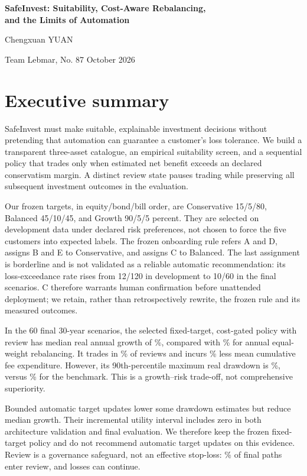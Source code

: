 \documentclass[11pt,a4paper]{article}
\begin{document}
\begin{center}
{\Large\bfseries SafeInvest: Suitability, Cost-Aware Rebalancing,\\[3pt]
and the Limits of Automation}\par
\vspace{7pt}
{\large Chengxuan YUAN}\par
Team Lebmar, No. 87  October 2026
\end{center}

\section*{Executive summary}
SafeInvest must make suitable, explainable investment decisions without
pretending that automation can guarantee a customer's loss tolerance. We build
a transparent three-asset catalogue, an empirical suitability screen, and a
sequential policy that trades only when estimated net benefit exceeds an
declared conservatism margin. A distinct review state pauses trading while preserving
all subsequent investment outcomes in the evaluation.

Our frozen targets, in equity/bond/bill order, are Conservative
15/5/80, Balanced 45/10/45, and Growth 90/5/5 percent. They are selected on
development data under declared risk preferences, not chosen to force the five
customers into expected labels. The frozen onboarding rule refers A and D,
assigns B and E to Conservative, and assigns C to Balanced.
The last assignment is borderline and is not validated as a reliable automatic
recommendation: its loss-exceedance rate rises from 12/120 in development to
10/60 in the final scenarios. C therefore warrants human confirmation before
unattended deployment; we retain, rather than retrospectively rewrite, the
frozen rule and its measured outcomes.

In the 60 final 30-year scenarios, the selected fixed-target, cost-gated policy
with review has median real annual growth of \PolicyGrowth\%, compared with
\BaseGrowth\% for annual equal-weight rebalancing. It trades in
\PolicyTrade\% of reviews and incurs \FeeReduction\% less mean cumulative
fee expenditure. However, its 90th-percentile maximum real drawdown is
\PolicyLoss\%, versus \BaseLoss\% for the benchmark. This is a growth--risk
trade-off, not comprehensive superiority.

Bounded automatic target updates lower some drawdown estimates but reduce
median growth. Their incremental utility interval includes zero in both
architecture validation and final evaluation. We therefore keep the frozen
fixed-target policy and do not recommend automatic target updates on this
evidence. Review is a governance safeguard, not an effective stop-loss:
\PolicyReview\% of final paths enter review, and losses can continue.
\end{document}

